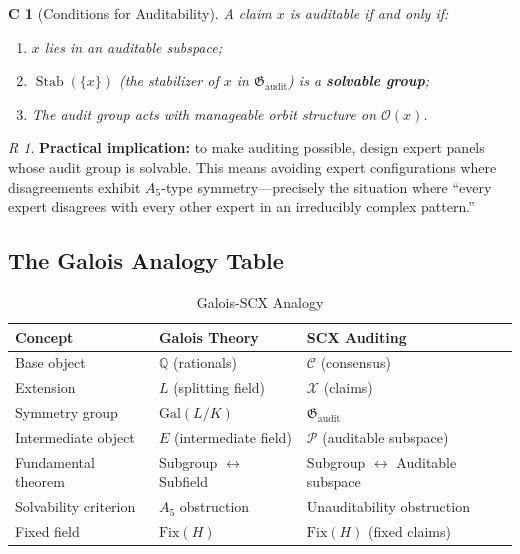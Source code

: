 \documentclass[12pt,a4paper]{article}
\newtheorem{corollary}[theorem]Corollary
\theoremstyle{remark}
\newtheorem{remark}[theorem]Remark
\newcommand{\Q}{\mathbb{Q}}
\newcommand{\Gal}{\mathrm{Gal}}
\newcommand{\Fix}{\mathrm{Fix}}
\newcommand{\AuditGrp}{\mathfrak{G}_{\mathrm{audit}}}
\newcommand{\CEC}{\mathcal{C}}
\newcommand{\ClaimSpace}{\mathcal{X}}
\DeclareMathOperator{\Stab}{Stab}
\begin{document}
\begin{corollary}[Conditions for Auditability]
A claim \(x\) is auditable if and only if:
\begin{enumerate}[label=(\arabic*),itemsep=3pt]
    \item \(x\) lies in an auditable subspace;
    \item \(\Stab(\{x\})\) (the stabilizer of \(x\) in \(\AuditGrp\)) is a \textbf{solvable group};
    \item The audit group acts with manageable orbit structure on \(\mathcal{O}(x)\).
\end{enumerate}
\end{corollary}
\begin{remark}
\textbf{Practical implication:} to make auditing possible, design expert panels whose audit group is solvable. This means avoiding expert configurations where disagreements exhibit \(A_5\)-type symmetry---precisely the situation where ``every expert disagrees with every other expert in an irreducibly complex pattern.''
\end{remark}

\subsection{The Galois Analogy Table}
\begin{table}[htbp]
\centering
\caption{Galois-SCX Analogy}
\label{tab:analogy}
\begin{tabular}{@{}p{4.5cm} p{4.5cm} p{4.5cm}@{}}
\toprule
\textbf{Concept} & \textbf{Galois Theory} & \textbf{SCX Auditing} \\
\midrule
Base object & \(\Q\) (rationals) & \(\CEC\) (consensus) \\
Extension & \(L\) (splitting field) & \(\ClaimSpace\) (claims) \\
Symmetry group & \(\Gal(L/K)\) & \(\AuditGrp\) \\
Intermediate object & \(E\) (intermediate field) & \(\mathcal{P}\) (auditable subspace) \\
Fundamental theorem & Subgroup \(\leftrightarrow\) Subfield & Subgroup \(\leftrightarrow\) Auditable subspace \\
Solvability criterion & \(A_5\) obstruction & Unauditability obstruction \\
Fixed field & \(\Fix(H)\) & \(\Fix(H)\) (fixed claims) \\
\bottomrule
\end{tabular}
\end{table}
\end{document}
